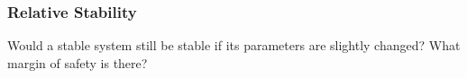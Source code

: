 \documentclass[12pt,letter]{article}
\begin{document}
\subsubsection{Relative Stability}
Would a stable system still be stable if its parameters are slightly changed? What margin of safety is there?






	\pagebreak
	\renewcommand{\thepage}{}
	\renewcommand\refname{References Cited}
	\pagestyle{plain}
	
	
\end{document}
